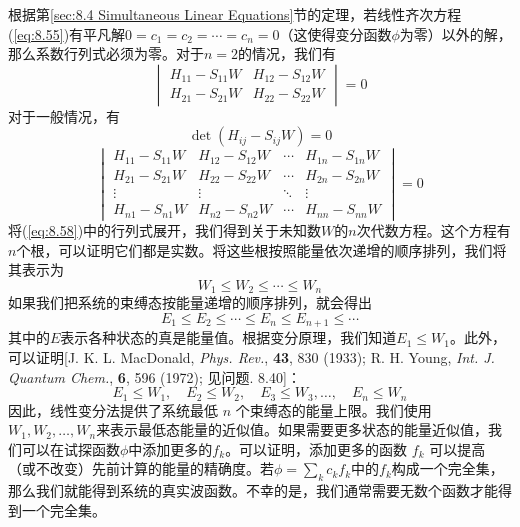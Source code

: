     根据第\ref{sec:8.4 Simultaneous Linear Equations}节的定理，若线性齐次方程(\ref{eq:8.55})有平凡解$0=c_1=c_2=\cdots=c_n=0$（这使得变分函数$\phi$为零）以外的解，那么系数行列式必须为零。对于$n=2$的情况，我们有
    \begin{equation}
        \begin{vmatrix}
            H_{11} - S_{11}W & H_{12} - S_{12}W \\
            H_{21} - S_{21}W & H_{22} - S_{22}W
        \end{vmatrix} = 0
        \label{eq:8.56}
    \end{equation}
    对于一般情况，有
    \begin{equation}
        \boxed{
            \det\left(H_{ij} - S_{ij}W\right) = 0
        }
        \label{eq:8.57}
    \end{equation}
    \begin{equation}
        \begin{vmatrix}
            H_{11} - S_{11}W & H_{12} - S_{12}W & \cdots & H_{1n} - S_{1n}W \\
            H_{21} - S_{21}W & H_{22} - S_{22}W & \cdots & H_{2n} - S_{2n}W \\
            \vdots & \vdots & \ddots & \vdots \\
            H_{n1} - S_{n1}W & H_{n2} - S_{n2}W & \cdots & H_{nn} - S_{nn}W
        \end{vmatrix} = 0
        \label{eq:8.58}
    \end{equation}
    将(\ref{eq:8.58})中的行列式展开，我们得到关于未知数$W$的$n$次代数方程。这个方程有$n$个根，可以证明它们都是实数。将这些根按照能量依次递增的顺序排列，我们将其表示为
    \begin{equation}
        W_1 \leq W_2 \leq \cdots \leq W_n
        \label{eq:8.59}
    \end{equation}
    如果我们把系统的束缚态按能量递增的顺序排列，就会得出
    \begin{equation}
        E_1 \leq E_2 \leq \cdots \leq E_n \leq E_{n+1} \leq \cdots
        \label{eq:8.60}
    \end{equation}
    其中的$E$表示各种状态的真是能量值。根据变分原理，我们知道$E_1 \leq W_1$。此外，可以证明[J. K. L. MacDonald, \textit{Phys. Rev.}, \textbf{43}, 830 (1933); R. H. Young, \textit{Int. J. Quantum Chem.}, \textbf{6}, 596 (1972); 见问题. 8.40]：
    \begin{equation}
        E_1 \leq W_1, \quad E_2 \leq W_2, \quad E_3 \leq W_3, \ldots, \quad E_n \leq W_n
        \label{eq:8.61}
    \end{equation}
    因此，线性变分法提供了系统最低 $n$ 个束缚态的能量上限。我们使用$W_1,W_2,\ldots,W_n$来表示最低态能量的近似值。如果需要更多状态的能量近似值，我们可以在试探函数$\phi$中添加更多的$f_k$。可以证明，添加更多的函数 $f_k$ 可以提高（或不改变）先前计算的能量的精确度。若$\phi = \sum_{k}c_kf_k$中的$f_k$构成一个完全集，那么我们就能得到系统的真实波函数。不幸的是，我们通常需要无数个函数才能得到一个完全集。

